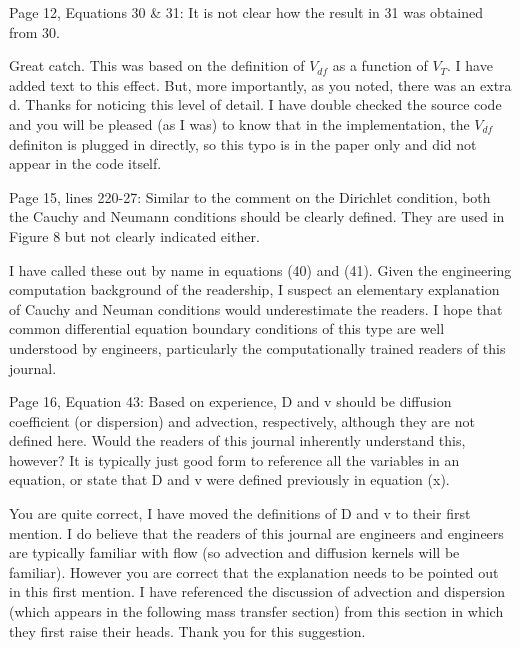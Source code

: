 \documentclass[answers,12pt]{exam}
\begin{document}
\begin{questions}
\question Page 12, Equations 30 \& 31: It is not clear how the result in 31 was 
obtained from 30.  \begin{solution}
Great catch. This was based on the definition of $V_{df}$ as a function of
$V_T$. I have added text to this effect. But, more importantly, as you noted,
there was an extra d. Thanks for noticing this level of detail. I have double
checked the source code and you will be pleased (as I was) to know that in the
implementation, the $V_{df}$ definiton is plugged in directly, so this typo is
in the paper only and did not appear in the code itself.  \end{solution} 
 
\question Page 15, lines 220-27: Similar to the comment on the Dirichlet 
condition, both the Cauchy and Neumann conditions should be clearly defined. 
They are used in Figure 8 but not clearly indicated either.  \begin{solution}
I have called these out by name in equations (40) and (41). Given the
engineering computation background of the readership, I suspect an elementary
explanation of Cauchy and Neuman conditions would underestimate the readers.
I hope that common differential equation boundary conditions of this type are 
        well
understood by engineers, particularly the computationally trained readers of
this journal.
\end{solution}
 
\question Page  16,  Equation  43:  Based  on  experience,  D  and  v  should  
be  diffusion coefficient (or dispersion) and advection,  respectively,  
although  they  are  not  defined  here.  Would  the  readers  of  this  
journal inherently understand  this,  however?  It  is  typically  just  good  
form  to  reference  all  the  variables  in  an  equation,  or state that D 
and v were defined previously in equation (x).  
\begin{solution}
        You are quite correct, I have moved the definitions of D and v to their 
        first mention. I do believe that the readers of this journal are 
        engineers and engineers are typically familiar with flow (so advection and diffusion kernels will 
        be familiar). However you are correct that the explanation needs to be 
        pointed out in this first mention. I have referenced the discussion of 
        advection and dispersion (which appears in the following mass transfer 
        section) from this section in which they first raise their 
        heads. Thank you for this suggestion.
        

\end{solution}
\end{questions}
\end{document}
